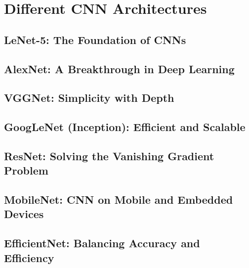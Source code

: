 \chapter{Different CNN Architectures}\label{chp:5}
\section{LeNet-5: The Foundation of CNNs}
\section{AlexNet: A Breakthrough in Deep Learning}
\section{VGGNet: Simplicity with Depth}
\section{GoogLeNet (Inception): Efficient and Scalable}
\section{ResNet: Solving the Vanishing Gradient Problem}
\section{MobileNet: CNN on Mobile and Embedded Devices}
\section{EfficientNet: Balancing Accuracy and Efficiency}